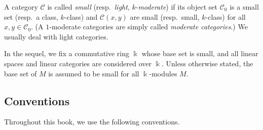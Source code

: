 \documentclass{surv-l}
\numberwithin{equation}{chapter}
\numberwithin{figure}{chapter}
\theoremstyle{plain}
\theoremstyle{definition}
\theoremstyle{remark}
\begin{document}
A category ${\mathcal{C}}$ is called \emph{small} (resp.\ \emph{light}, $k$-\emph{moderate})
if its object set ${\mathcal{C}}_0$
is a small set (resp.\  a class, $k$-class)
and ${\mathcal{C}}(x, y)$ are small (resp.\ small, $k$-class) for all
$x, y \in {\mathcal{C}}_0$.
(A $1$-moderate categories are simply called \emph{moderate categories}.)
We usually deal with light categories.

In the sequel, we fix a commutative ring $\Bbbk$ whose base set is small,
and all linear spaces and linear categories are considered over $\Bbbk$.
Unless otherwise stated, the base set of $M$ is assumed to be small
for all $\Bbbk$-modules $M$.

\subsection*{Conventions}
Throughout this book, we use the following conventions.
\end{document}
